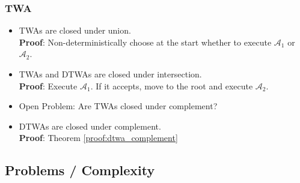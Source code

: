 \documentclass{article}
\begin{document}
\subsubsection{TWA}
\begin{itemize}
	\item TWAs are closed under union. \\
		\textbf{Proof}: Non-deterministically choose at the start whether to execute $\mathcal{A}_1$ or $\mathcal{A}_2$.
	\item TWAs and DTWAs are closed under intersection. \\
		\textbf{Proof}: Execute $\mathcal{A}_1$. If it accepts, move to the root and execute $\mathcal{A}_2$.
	\item Open Problem: Are TWAs closed under complement?
	\item DTWAs are closed under complement. \\
		\textbf{Proof}: Theorem \ref{proof:dtwa_complement}
\end{itemize}


\subsection{Problems / Complexity}
\end{document}
